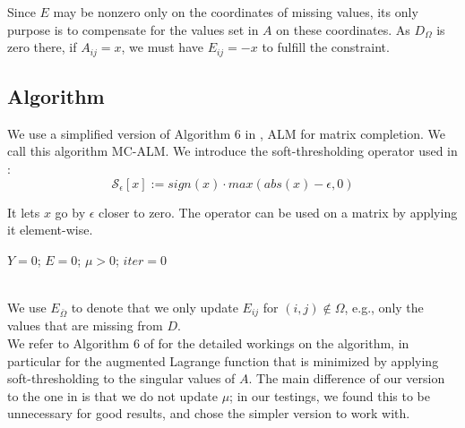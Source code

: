 \documentclass[10pt,conference,compsocconf]{IEEEtran}
\begin{document}
Since $E$ may be nonzero only on the coordinates of missing values, its only purpose is to compensate for the values set in $A$ on these coordinates. As $D_{\Omega}$ is zero there, if $A_{ij} = x$, we must have $E_{ij} = -x$ to fulfill the constraint. \\

\subsection{Algorithm}

We use a simplified version of Algorithm 6 in \cite{almpaper}, ALM for matrix completion. We call this algorithm MC-ALM. We introduce the soft-thresholding operator used in \cite{almpaper}: \\

$$\mathcal{S}_{\epsilon}[x] := sign(x) \cdot max(abs(x) - \epsilon, 0)$$

It lets $x$ go by $\epsilon$ closer to zero. The operator can be used on a matrix by applying it element-wise. 


\begin{algorithm}
$Y = 0$; $E = 0$; $\mu > 0$; $iter = 0$ \\
\ \\

\end{algorithm}

We use $E_{\bar{\Omega}}$ to denote that we only update $E_{ij}$ for $(i, j) \notin \Omega$, e.g., only the values that are missing from $D$. \\

We refer to Algorithm 6 of \cite{almpaper} for the detailed workings on the algorithm, in particular for the augmented Lagrange function that is minimized by applying soft-thresholding to the singular values of $A$. The main difference of our version to the one in \cite{almpaper} is
that we do not update $\mu$; in our testings, we found this to be unnecessary for good results, and chose the simpler version to work with.
\end{document}
